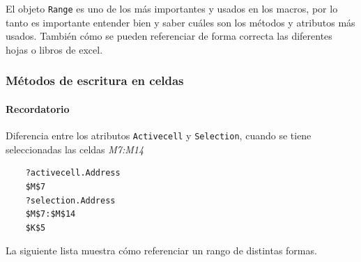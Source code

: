 El objeto \texttt{Range} es uno de los más importantes y usados en los macros, por lo tanto es importante entender bien y saber cuáles son los métodos y atributos más usados. También cómo se pueden referenciar de forma correcta las diferentes hojas o libros de excel. 

\subsubsection{Métodos de escritura en celdas}

\paragraph{Recordatorio} Diferencia entre los atributos \texttt{Activecell} y \texttt{Selection}, cuando se tiene seleccionadas las celdas \textit{M7:M14}
    \begin{verbatim}
    ?activecell.Address
    $M$7
    ?selection.Address
    $M$7:$M$14
    $K$5
    \end{verbatim}

La siguiente lista muestra cómo referenciar un rango de distintas formas.

